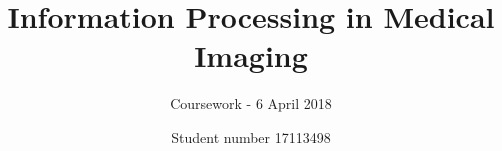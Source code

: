 \documentclass[runningheads]{llncs}
\begin{document}
%
\title{Information Processing in Medical Imaging}
\subtitle{Coursework - 6 April 2018}
%
%
\author{Student number 17113498 }
%
%
%
\maketitle              %







%
%
%
\clearpage


\end{document}
